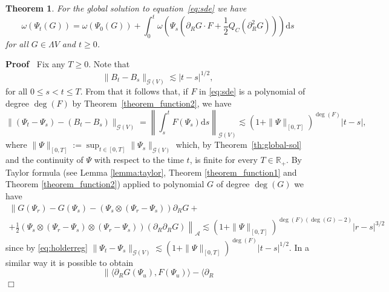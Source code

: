 \documentclass{article}
\newcommand{\assign}{:=}
\newcommand{\mathd}{\mathrm{d}}
\newcommand{\nobracket}{}
\newenvironment{proof}{\noindent\textbf{Proof\ }}{\hspace*{\fill}$\Box$\medskip}
\newtheorem{theorem}{Theorem}
\begin{document}
\begin{theorem}
  \label{th:ito}For the global solution to equation~{\eqref{eq:sde}} we have
  \begin{equation}
    \omega (\Psi_t (G)) = \omega (\Psi_0 (G)) + \int_0^t \omega \left( \Psi_s
    \left( \partial_R G \cdot F + \frac{1}{2} Q_C (\partial_R^2 G) \right)
    \right) \mathd s \label{eq:ito-3}
  \end{equation}
  for all $G \in \Lambda V$ and $t \geqslant 0$.
\end{theorem}

\begin{proof}
  Fix any $T \geqslant 0$. Note that
  \[ \| B_t - B_s \|_{\mathcal{G} (V)} \lesssim | t - s |^{1 / 2}, \]
  for all $0 \leqslant s < t \leqslant T$. From that it follows that, if $F$
  in {\eqref{eq:sde}} is a polynomial of degree $\deg (F)$ by
  Theorem~\ref{theorem_function2}, we have
  \begin{equation}
    \| (\Psi_t - \Psi_s) - (B_t - B_s) \|_{\mathcal{G} (V)} = \left\| \int_s^t
    F (\Psi_s) \mathd s \right\|_{\mathcal{G} (V)} \lesssim (1 + \| \Psi
    \|_{[0, T]})^{\deg (F)} | t - s |, \label{eq:holderreg}
  \end{equation}
  where $\| \Psi \|_{[0, T]} \assign \sup_{t \in [0, T]} \| \Psi_s
  \|_{\mathcal{G} (V)}$ which, by Theorem~\ref{th:global-sol} and the
  continuity of $\Psi$ with respect to the time $t$, is finite for every $T
  \in \mathbb{R}_+$. By Taylor formula (see Lemma \ref{lemma:taylor}, Theorem
  \ref{theorem_function1} and Theorem \ref{theorem_function2}) applied to
  polynomial $G$ of degree $\deg (G)$ we have
  \begin{equation}
    \begin{array}{c}
      \nobracket \| G (\Psi_r) - G (\Psi_s) - (\Psi_s \otimes (\Psi_r -
      \Psi_s)) \partial_R G + \nobracket \nobracket\\
      \left. \left. + \frac{1}{2} (\Psi_s \otimes (\Psi_r - \Psi_s) \otimes
      (\Psi_r - \Psi_s)) (\partial_R \partial_R G) \right\|
      \right._{\mathcal{A}} \lesssim (1 + \| \Psi \|_{[0, T]})^{\deg (F) (\deg
      (G) - 2)} | r - s |^{3 / 2}
    \end{array} \label{eq:holderreg2}
  \end{equation}
  since by {\eqref{eq:holderreg}} $\| \Psi_t - \Psi_s \|_{\mathcal{G} (V)}
  \lesssim (1 + \| \Psi \|_{[0, T]})^{\deg (F)} | t - s |^{1 / 2}$. In a
  similar way it is possible to obtain
  \begin{equation}
    \| \langle \partial_R G (\Psi_u), F (\Psi_u) \rangle - \langle \partial_R

\end{equation}
\end{proof}
\end{document}
